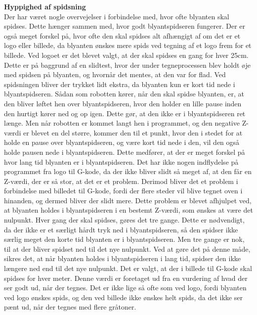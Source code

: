 \textbf{Hyppighed af spidsning}\\
Der har været nogle overvejelser i forbindelse med, hvor ofte blyanten skal spidses. Dette hænger sammen med, hvor godt blyantspidseren fungerer. Der er også meget forskel på, hvor ofte den skal spidses alt afhængigt af om det er et logo eller billede, da blyanten ønskes mere spids ved tegning af et logo frem for et billede. Ved logoet er  det blevet valgt, at der skal spidses en gang for hver 25cm. Dette er på baggrund af en slidtest, hvor der under tegneprocessen blev holdt øje med spidsen på blyanten, og hvornår det mentes, at den var for flad. Ved spidsningen bliver der trykket lidt ekstra, da blyanten kun er kort tid nede i blyantspidseren. Sådan som robotten kører, når den skal spidse blyanten, er, at den bliver løftet hen over blyantspidseren, hvor den holder en lille pause inden den hurtigt kører ned og op igen. Dette gør, at den ikke er i blyantspidseren ret længe. Men når robotten er kommet langt hen i programmet, og den negative Z-værdi er blevet en del større, kommer den til et punkt, hvor den i stedet for at holde en pause over blyantspidseren, og være kort tid nede i den, vil den også holde pausen nede i blyantspidseren. Dette medfører, at der er meget forskel på hvor lang tid blyanten er i blyantspidseren. Det har ikke nogen indflydelse på programmet fra logo til G-kode, da der ikke bliver slidt så meget af, at den får en Z-værdi, der er så stor, at det er et problem. Derimod bliver det et problem i forbindelse med billedet til G-kode, fordi der flere steder vil blive tegnet oven i hinanden, og dermed bliver der slidt mere. Dette problem er blevet afhjulpet ved, at blyanten holdes i blyantspidseren i en bestemt Z-værdi, som ønskes at være det nulpunkt. Hver gang der skal spidses, gøres det tre gange. Dette er nødvendigt, da der ikke er et særligt hårdt tryk ned i blyantspidseren, så den spidser ikke særlig meget den korte tid blyanten er i blyantspidseren. Men tre gange er nok, til at der bliver spidset ned til det nye nulpunkt. Ved at gøre det på denne måde, sikres det, at når blyanten holdes i blyantspidseren i lang tid, spidser den ikke længere ned end til det nye nulpunkt. Det er valgt, at der i billede til G-kode skal spidses for hver meter. Denne værdi er foretaget ud fra en vurdering af hvad der ser godt ud, når der tegnes. Det er ikke lige så ofte som ved logo, fordi blyanten ved logo ønskes spids, og den ved billede ikke ønskes helt spids, da det ikke ser pænt ud, når der tegnes med flere gråtoner.


